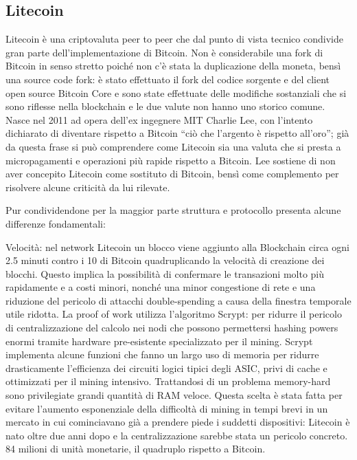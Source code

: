 \subsection{Litecoin}
Litecoin è una criptovaluta peer to peer che dal punto di vista tecnico condivide gran parte dell’implementazione di Bitcoin. Non è considerabile una fork di Bitcoin in senso stretto poiché non c’è stata la duplicazione della moneta, bensì una source code fork: è stato effettuato il fork del codice sorgente e del client open source Bitcoin Core e sono state effettuate delle modifiche sostanziali che si sono riflesse nella blockchain e le due valute non hanno uno storico comune. 
Nasce nel 2011 ad opera dell’ex ingegnere MIT Charlie Lee, con l’intento dichiarato di diventare rispetto a Bitcoin “ciò che l’argento è rispetto all’oro”\cite{mediumltcsilver}; già da questa frase si può comprendere come Litecoin sia una valuta che si presta a micropagamenti e operazioni più rapide rispetto a Bitcoin. Lee sostiene di non aver concepito Litecoin come sostituto di Bitcoin, bensì come complemento per risolvere alcune criticità da lui rilevate.

Pur condividendone per la maggior parte struttura e protocollo presenta alcune differenze fondamentali:

Velocità: nel network Litecoin un blocco viene aggiunto alla Blockchain circa ogni 2.5 minuti contro i 10 di Bitcoin quadruplicando la velocità di creazione dei blocchi. Questo implica la possibilità di confermare le transazioni molto più rapidamente e a costi minori, nonché una minor congestione di rete e una riduzione del pericolo di attacchi double-spending a causa della finestra temporale utile ridotta.
La proof of work utilizza l’algoritmo Scrypt: per ridurre il pericolo di centralizzazione del calcolo nei nodi che possono permettersi hashing powers enormi tramite hardware pre-esistente specializzato per il mining.
Scrypt implementa alcune funzioni che fanno un largo uso di memoria per ridurre drasticamente l’efficienza dei circuiti logici tipici degli ASIC, privi di cache e ottimizzati per il mining intensivo. Trattandosi di un problema memory-hard sono privilegiate grandi quantità di RAM veloce. 
Questa scelta è stata fatta per evitare l’aumento esponenziale della difficoltà di mining in tempi brevi in un mercato in cui cominciavano già a prendere piede i suddetti dispositivi: Litecoin è nato oltre due anni dopo e la centralizzazione sarebbe stata un pericolo concreto.
84 milioni di unità monetarie, il quadruplo rispetto a Bitcoin.

